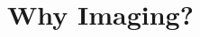 \documentclass[aspectratio=169]{beamer}
\begin{document}
\section{Why Imaging?}
\subsection{}


\end{document}
